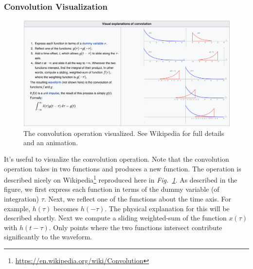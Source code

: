 \subsubsection{Convolution Visualization}
\begin{figure}[tb]
\centering
\includegraphics[width=.95\columnwidth]{conv_picture.png} 
\caption{The convolution operation visualized.  See Wikipedia for full details and an animation.}
\label{fig:conv_visual}
\end{figure}
It's useful to visualize the convolution operation.  Note that the convolution operation takes in two functions and produces a new function.  The operation is described nicely on Wikipedia\footnote{\url{https://en.wikipedia.org/wiki/Convolution}} reproduced here in \emph{Fig.~\ref{fig:conv_visual}}.  As described in the figure, we first express each function in terms of the dummy variable (of integration) $\tau$.  Next, we reflect one of the functions about the time axis.  For example, $h(\tau)$ becomes $h(-\tau)$.  The physical explanation for this will be described shortly.  Next we compute a sliding weighted-sum of the function $x(\tau)$ with $h(t-\tau)$.  Only points where the two functions intersect contribute significantly to the waveform.  
